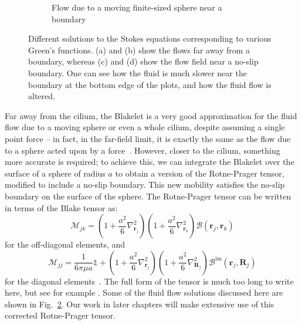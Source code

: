 \begin{figure}
\begin{subfigure}[t]{0.45\linewidth}
        \caption{Flow due to a moving finite-sized sphere near a boundary}%
        \label{fig:flow_sphere_rp_bc}%
    \end{subfigure}
    \caption{Different solutions to the Stokes equations corresponding to various Green's functions. (a) and (b) show the flows far away from a boundary, whereas (c) and (d) show the flow field near a no-slip boundary. One can see how the fluid is much slower near the boundary at the bottom edge of the plots, and how the fluid flow is altered.}
    \label{fig:flow_sphere}
\end{figure} %

Far away from the cilium, the Blakelet is a very good approximation for the fluid flow due to a moving sphere or even a whole cilium, despite assuming a single point force -- in fact, in the far-field limit, it is exactly the same as the flow due to a sphere acted upon by a force~. However, closer to the cilium, something more accurate is required; to achieve this, we can integrate the Blakelet over the surface of a sphere of radius $a$ to obtain a version of the Rotne-Prager tensor, modified to include a no-slip boundary. This new mobility satisfies the no-slip boundary on the surface of the sphere. The Rotne-Prager tensor can be written in terms of the Blake tensor as:
\begin{equation}
    \mathcal{M}_{jk} = \left( 1 + \frac{a^2}{6}\nabla^2_{\mathbf{r}_j} \right) \left( 1 + \frac{a^2}{6}\nabla^2_{\mathbf{r}_k} \right) \mathcal{B}(\mathbf{r}_j, \mathbf{r}_k)\label{eq:rp_offdiag}
\end{equation}
for the off-diagonal elements, and
\begin{equation}
    \mathcal{M}_{jj} = \frac{1}{6\pi\mu a}\mathbb{1} + \left( 1 + \frac{a^2}{6}\nabla^2_{\mathbf{r}_j} \right) \left( 1 + \frac{a^2}{6}\nabla^2_{\mathbf{R}_j} \right) \mathcal{B}^\text{im}(\mathbf{r}_j, \mathbf{R}_j)\label{eq:rp_diag}
\end{equation}
for the diagonal elements~. The full form of the tensor is much too long to write here, but see for example . Some of the fluid flow solutions discussed here are shown in Fig.~\ref{fig:flow_sphere}. Our work in later chapters will make extensive use of this corrected Rotne-Prager tensor.

